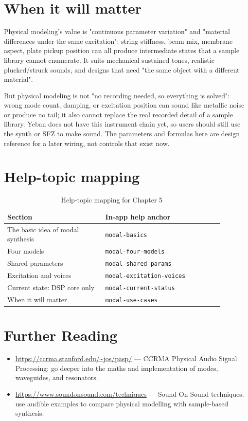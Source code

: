 
\section{When it will matter}

Physical modeling's value is "continuous parameter variation" and "material differences under the same excitation": string stiffness, beam mix, membrane aspect, plate pickup position can all produce intermediate states that a sample library cannot enumerate. It suits mechanical sustained tones, realistic plucked/struck sounds, and designs that need "the same object with a different material".

But physical modeling is not "no recording needed, so everything is solved": wrong mode count, damping, or excitation position can sound like metallic noise or produce no tail; it also cannot replace the real recorded detail of a sample library. Yeban does not have this instrument chain yet, so users should still use the synth or SFZ to make sound. The parameters and formulas here are design reference for a later wiring, not controls that exist now.

\section{Help-topic mapping}

\begin{table}[htbp]
\centering
\small
\begin{tabular}{@{}p{0.40\linewidth}p{0.48\linewidth}@{}}
\hline
Section & In-app help anchor \\
\hline
The basic idea of modal synthesis & \texttt{modal-basics} \\
Four models & \texttt{modal-four-models} \\
Shared parameters & \texttt{modal-shared-params} \\
Excitation and voices & \texttt{modal-excitation-voices} \\
Current state: DSP core only & \texttt{modal-current-status} \\
When it will matter & \texttt{modal-use-cases} \\
\hline
\end{tabular}
\caption{Help-topic mapping for Chapter 5}
\end{table}

\section*{Further Reading}
\begin{itemize}[leftmargin=1.5em]
\item \url{https://ccrma.stanford.edu/~jos/pasp/} — CCRMA Physical Audio Signal Processing: go deeper into the maths and implementation of modes, waveguides, and resonators.
\item \url{https://www.soundonsound.com/techniques} — Sound On Sound techniques: use audible examples to compare physical modelling with sample-based synthesis.
\end{itemize}
